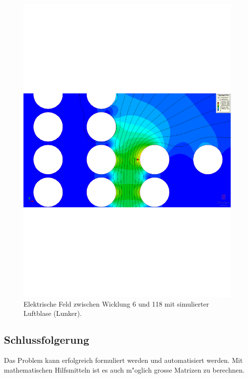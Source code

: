 \begin{refsection}
\begin{figure}
	\centering
	\includegraphics[width=\textwidth]{./trafo/images/VoltageTrans_bubble_turn6_10u_9u.pdf}
	\caption{Elektrische Feld zwischen Wicklung 6 und 118 mit simulierter Luftblase (Lunker).}
	\label{trafo:E-FieldBubble}
\end{figure}

\subsection{Schlussfolgerung}
Das Problem kann erfolgreich formuliert werden und automatisiert werden. Mit mathematischen Hilfsmitteln ist es auch m"oglich grosse Matrizen zu berechnen.

\printbibliography[heading=subbibliography]
\end{refsection}

